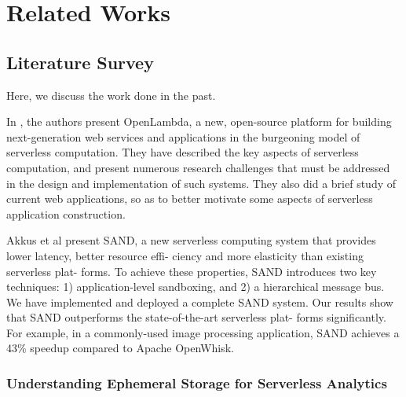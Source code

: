 

\chapter{Related Works} %

\label{Chapter 2} %


\section{Literature Survey}

Here, we discuss the work done in the past.

In \cite{openlambda}, the authors present OpenLambda, a new, open-source platform for building next-generation web services and applications in the burgeoning model of serverless computation. They have described the key aspects of serverless computation, and present numerous research challenges that must be addressed in the design and implementation of such systems. They also did a brief study of current web applications, so as to better motivate some aspects of serverless application construction.

Akkus et al \cite{Akkus_Sand_Usenix_2018} present SAND, a new serverless computing
system that provides lower latency, better resource effi-
ciency and more elasticity than existing serverless plat-
forms. To achieve these properties, SAND introduces two
key techniques: 1) application-level sandboxing, and 2)
a hierarchical message bus. We have implemented and
deployed a complete SAND system. Our results show 
that SAND outperforms the state-of-the-art serverless plat-
forms significantly. For example, in a commonly-used image processing application, SAND achieves a 43\%
speedup compared to Apache OpenWhisk.

\subsection{Understanding Ephemeral Storage for Serverless Analytics}

